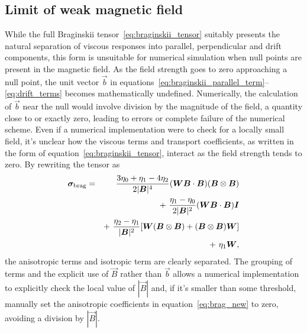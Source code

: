 \subsection{Limit of weak magnetic field}

While the full Braginskii tensor~\ref{eq:braginskii_tensor} suitably presents the natural separation of viscous responses into parallel, perpendicular and drift components, this form is unsuitable for numerical simulation when null points are present in the magnetic field. As the field strength goes to zero approaching a null point, the unit vector $\vec{b}$ in equations~\ref{eq:braginskii_parallel_term}--\ref{eq:drift_terms} becomes mathematically undefined. Numerically, the calculation of $\vec{b}$ near the null would involve division by the magnitude of the field, a quantity close to or exactly zero, leading to errors or complete failure of the numerical scheme. Even if a numerical implementation were to check for a locally small field, it's unclear how the viscous terms and transport coefficients, as written in the form of equation~\ref{eq:braginskii_tensor}, interact as the field strength tends to zero. By rewriting the tensor as
\begin{eqnarray}\label{eq:brag_new}
\ten{\sigma}_{\rm brag} = &&\frac{3\eta_0+\eta_1-4\eta_2}{2|\vec{B}|^4}(\ten{W}\vec{B}\cdot\vec{B})(\vec{B}\otimes\vec{B})\\%
\nonumber
& &+~ \frac{\eta_1-\eta_0}{2|\vec{B}|^2}(\ten{W}\vec{B}\cdot\vec{B})\ten{I}\\%
\nonumber
& &+~ \frac{\eta_2-\eta_1}{|\vec{B}|^2}[\ten{W}(\vec{B}\otimes\vec{B})+(\vec{B}\otimes\vec{B})\ten{W}] \\%
\nonumber
& &+~ \eta_1\ten{W},%
\end{eqnarray}
the anisotropic terms and isotropic term are clearly separated. The grouping of terms and the explicit use of $\vec{B}$ rather than $\vec{b}$ allows a numerical implementation to explicitly check the local value of $|\vec{B}|$ and, if it's smaller than some threshold, manually set the anisotropic coefficients in equation~\ref{eq:brag_new} to zero, avoiding a division by $|\vec{B}|$.

